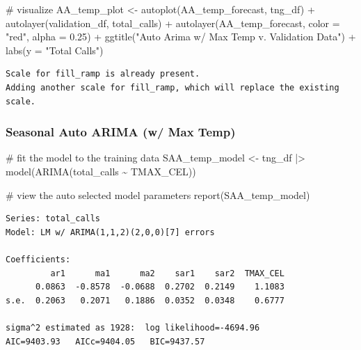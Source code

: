 \documentclass[
  letterpaper,
  DIV=11,
  numbers=noendperiod]{scrartcl}
\newenvironment{Shaded}{\begin{snugshade}}{\end{snugshade}}
\newcommand{\AttributeTok}[1]{\textcolor[rgb]{0.40,0.45,0.13}{#1}}
\newcommand{\CommentTok}[1]{\textcolor[rgb]{0.37,0.37,0.37}{#1}}
\newcommand{\FloatTok}[1]{\textcolor[rgb]{0.68,0.00,0.00}{#1}}
\newcommand{\FunctionTok}[1]{\textcolor[rgb]{0.28,0.35,0.67}{#1}}
\newcommand{\NormalTok}[1]{\textcolor[rgb]{0.00,0.23,0.31}{#1}}
\newcommand{\OtherTok}[1]{\textcolor[rgb]{0.00,0.23,0.31}{#1}}
\newcommand{\SpecialCharTok}[1]{\textcolor[rgb]{0.37,0.37,0.37}{#1}}
\newcommand{\StringTok}[1]{\textcolor[rgb]{0.13,0.47,0.30}{#1}}
\begin{document}
\begin{Shaded}
\begin{Highlighting}[]
\CommentTok{\# visualize}
\NormalTok{AA\_temp\_plot }\OtherTok{\textless{}{-}} \FunctionTok{autoplot}\NormalTok{(AA\_temp\_forecast, tng\_df) }\SpecialCharTok{+} 
  \FunctionTok{autolayer}\NormalTok{(validation\_df, total\_calls) }\SpecialCharTok{+} 
  \FunctionTok{autolayer}\NormalTok{(AA\_temp\_forecast, }\AttributeTok{color =} \StringTok{"red"}\NormalTok{, }\AttributeTok{alpha =} \FloatTok{0.25}\NormalTok{) }\SpecialCharTok{+}
  \FunctionTok{ggtitle}\NormalTok{(}\StringTok{"Auto Arima w/ Max Temp v. Validation Data"}\NormalTok{) }\SpecialCharTok{+} 
  \FunctionTok{labs}\NormalTok{(}\AttributeTok{y =} \StringTok{"Total Calls"}\NormalTok{)}
\end{Highlighting}
\end{Shaded}

\begin{verbatim}
Scale for fill_ramp is already present.
Adding another scale for fill_ramp, which will replace the existing scale.
\end{verbatim}

\subsubsection{Seasonal Auto ARIMA (w/ Max
Temp)}\label{seasonal-auto-arima-w-max-temp}

\begin{Shaded}
\begin{Highlighting}[]
\CommentTok{\# fit the model to the training data}
\NormalTok{SAA\_temp\_model }\OtherTok{\textless{}{-}}\NormalTok{ tng\_df }\SpecialCharTok{|\textgreater{}}
  \FunctionTok{model}\NormalTok{(}\FunctionTok{ARIMA}\NormalTok{(total\_calls }\SpecialCharTok{\textasciitilde{}}\NormalTok{ TMAX\_CEL))}

\CommentTok{\# view the auto selected model parameters}
\FunctionTok{report}\NormalTok{(SAA\_temp\_model)}
\end{Highlighting}
\end{Shaded}

\begin{verbatim}
Series: total_calls 
Model: LM w/ ARIMA(1,1,2)(2,0,0)[7] errors 

Coefficients:
         ar1      ma1      ma2    sar1    sar2  TMAX_CEL
      0.0863  -0.8578  -0.0688  0.2702  0.2149    1.1083
s.e.  0.2063   0.2071   0.1886  0.0352  0.0348    0.6777

sigma^2 estimated as 1928:  log likelihood=-4694.96
AIC=9403.93   AICc=9404.05   BIC=9437.57
\end{verbatim}
\end{document}

